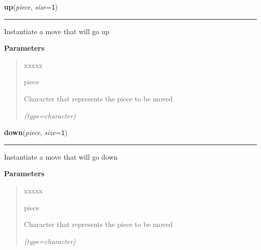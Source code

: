 \hspace{.8\funcindent}\begin{boxedminipage}{\funcwidth}

    \raggedright \textbf{up}(\textit{piece}, \textit{size}={\tt 1})

    \vspace{-1.5ex}

    \rule{\textwidth}{0.5\fboxrule}
\setlength{\parskip}{2ex}
    Instantiate a move that will go up

\setlength{\parskip}{1ex}
      \textbf{Parameters}
      \vspace{-1ex}

      \begin{quote}
        \begin{Ventry}{xxxxx}

          \item[piece]

          Character that represents the piece to be moved

            {\it (type=character)}

        \end{Ventry}

      \end{quote}

    \end{boxedminipage}

    \label{UnBlockMe:Map:Move:Move:down}

    \vspace{0.5ex}

\hspace{.8\funcindent}\begin{boxedminipage}{\funcwidth}

    \raggedright \textbf{down}(\textit{piece}, \textit{size}={\tt 1})

    \vspace{-1.5ex}

    \rule{\textwidth}{0.5\fboxrule}
\setlength{\parskip}{2ex}
    Instantiate a move that will go down

\setlength{\parskip}{1ex}
      \textbf{Parameters}
      \vspace{-1ex}

      \begin{quote}
        \begin{Ventry}{xxxxx}

          \item[piece]

          Character that represents the piece to be moved

            {\it (type=character)}

        \end{Ventry}

      \end{quote}

    \end{boxedminipage}


